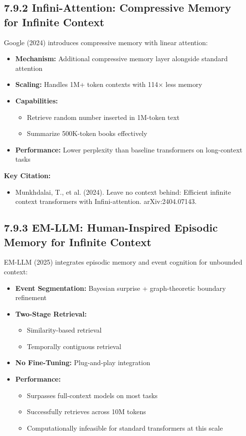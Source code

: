 \documentclass[11pt,letterpaper]{article}
\begin{document}
\subsection{7.9.2 Infini-Attention: Compressive Memory for Infinite Context}

Google (2024) introduces compressive memory with linear attention:

\begin{itemize}[leftmargin=*]
    \item \textbf{Mechanism:} Additional compressive memory layer alongside standard attention
    \item \textbf{Scaling:} Handles 1M+ token contexts with 114× less memory
    \item \textbf{Capabilities:}
    \begin{itemize}
        \item Retrieve random number inserted in 1M-token text
        \item Summarize 500K-token books effectively
    \end{itemize}
    \item \textbf{Performance:} Lower perplexity than baseline transformers on long-context tasks
\end{itemize}

\textbf{Key Citation:}
\begin{itemize}[leftmargin=*]
    \item Munkhdalai, T., et al. (2024). Leave no context behind: Efficient infinite context transformers with Infini-attention. arXiv:2404.07143.
\end{itemize}

\subsection{7.9.3 EM-LLM: Human-Inspired Episodic Memory for Infinite Context}

EM-LLM (2025) integrates episodic memory and event cognition for unbounded context:

\begin{itemize}[leftmargin=*]
    \item \textbf{Event Segmentation:} Bayesian surprise + graph-theoretic boundary refinement
    \item \textbf{Two-Stage Retrieval:}
    \begin{itemize}
        \item Similarity-based retrieval
        \item Temporally contiguous retrieval
    \end{itemize}
    \item \textbf{No Fine-Tuning:} Plug-and-play integration
    \item \textbf{Performance:}
    \begin{itemize}
        \item Surpasses full-context models on most tasks
        \item Successfully retrieves across 10M tokens
        \item Computationally infeasible for standard transformers at this scale
    \end{itemize}
\end{itemize}
\end{document}

